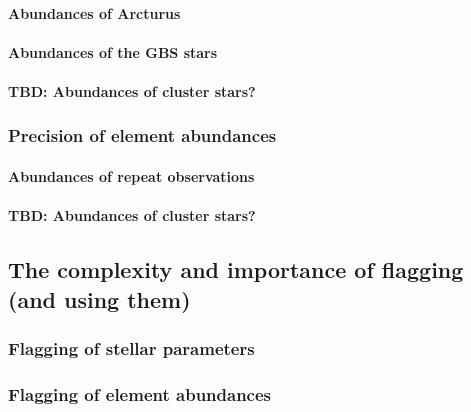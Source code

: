 \documentclass[fleqn,usenatbib,useAMS]{mnras}
\begin{document}
\paragraph*{Abundances of Arcturus}

\paragraph*{Abundances of the GBS stars}

\paragraph*{TBD: Abundances of cluster stars?}

\subsubsection{Precision of element abundances}

\paragraph*{Abundances of repeat observations}

\paragraph*{TBD: Abundances of cluster stars?}

\subsection{The complexity and importance of flagging (and using them)}

\subsubsection{Flagging of stellar parameters}

\subsubsection{Flagging of element abundances}
\end{document}
